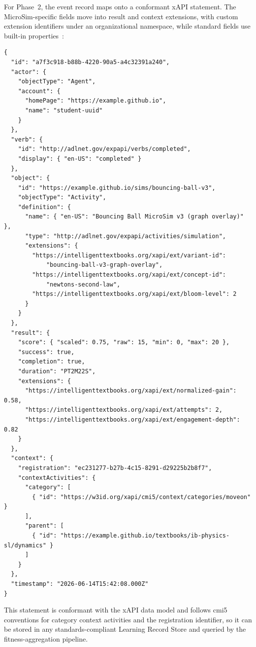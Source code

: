 For Phase~2, the event record maps onto a conformant xAPI statement. The
MicroSim-specific fields move into result and context extensions, with custom
extension identifiers under an organizational namespace, while standard fields
use built-in properties~\cite{rustici2024cmi5}:

\begin{lstlisting}[style=json]
{
  "id": "a7f3c918-b88b-4220-90a5-a4c32391a240",
  "actor": {
    "objectType": "Agent",
    "account": {
      "homePage": "https://example.github.io",
      "name": "student-uuid"
    }
  },
  "verb": {
    "id": "http://adlnet.gov/expapi/verbs/completed",
    "display": { "en-US": "completed" }
  },
  "object": {
    "id": "https://example.github.io/sims/bouncing-ball-v3",
    "objectType": "Activity",
    "definition": {
      "name": { "en-US": "Bouncing Ball MicroSim v3 (graph overlay)" },
      "type": "http://adlnet.gov/expapi/activities/simulation",
      "extensions": {
        "https://intelligenttextbooks.org/xapi/ext/variant-id":
            "bouncing-ball-v3-graph-overlay",
        "https://intelligenttextbooks.org/xapi/ext/concept-id":
            "newtons-second-law",
        "https://intelligenttextbooks.org/xapi/ext/bloom-level": 2
      }
    }
  },
  "result": {
    "score": { "scaled": 0.75, "raw": 15, "min": 0, "max": 20 },
    "success": true,
    "completion": true,
    "duration": "PT2M22S",
    "extensions": {
      "https://intelligenttextbooks.org/xapi/ext/normalized-gain": 0.58,
      "https://intelligenttextbooks.org/xapi/ext/attempts": 2,
      "https://intelligenttextbooks.org/xapi/ext/engagement-depth": 0.82
    }
  },
  "context": {
    "registration": "ec231277-b27b-4c15-8291-d29225b2b8f7",
    "contextActivities": {
      "category": [
        { "id": "https://w3id.org/xapi/cmi5/context/categories/moveon" }
      ],
      "parent": [
        { "id": "https://example.github.io/textbooks/ib-physics-sl/dynamics" }
      ]
    }
  },
  "timestamp": "2026-06-14T15:42:08.000Z"
}
\end{lstlisting}

This statement is conformant with the xAPI data model and follows cmi5
conventions for category context activities and the registration identifier,
so it can be stored in any standards-compliant Learning Record Store and
queried by the fitness-aggregation pipeline.

